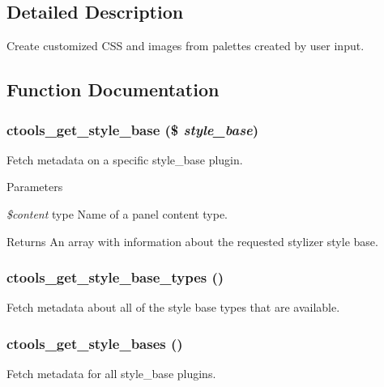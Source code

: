\subsection{Detailed Description}
Create customized CSS and images from palettes created by user input. 

\subsection{Function Documentation}
\hypertarget{includes_2stylizer_8inc_a658801d5f944d817d7708fc74896f4ff}{
\subsubsection[{ctools\_\-get\_\-style\_\-base}]{\setlength{\rightskip}{0pt plus 5cm}ctools\_\-get\_\-style\_\-base (\$ {\em style\_\-base})}}
\label{includes_2stylizer_8inc_a658801d5f944d817d7708fc74896f4ff}
Fetch metadata on a specific style\_\-base plugin.


\begin{DoxyParams}{Parameters}
\item[{\em \$content}]type Name of a panel content type.\end{DoxyParams}
\begin{DoxyReturn}{Returns}
An array with information about the requested stylizer style base. 
\end{DoxyReturn}
\hypertarget{includes_2stylizer_8inc_afa58bf443f571c853346d908d15e62c1}{
\subsubsection[{ctools\_\-get\_\-style\_\-base\_\-types}]{\setlength{\rightskip}{0pt plus 5cm}ctools\_\-get\_\-style\_\-base\_\-types ()}}
\label{includes_2stylizer_8inc_afa58bf443f571c853346d908d15e62c1}
Fetch metadata about all of the style base types that are available. \hypertarget{includes_2stylizer_8inc_ac3b4248ca3d32e0c3c2e1d41eb82ba08}{
\subsubsection[{ctools\_\-get\_\-style\_\-bases}]{\setlength{\rightskip}{0pt plus 5cm}ctools\_\-get\_\-style\_\-bases ()}}
\label{includes_2stylizer_8inc_ac3b4248ca3d32e0c3c2e1d41eb82ba08}
Fetch metadata for all style\_\-base plugins.

